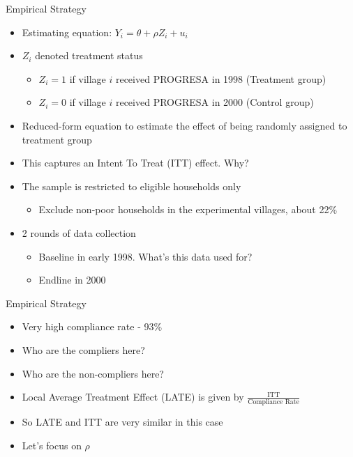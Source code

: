 \documentclass[11pt,notes=hide,aspectratio=169,mathserif]{beamer}
\begin{document}
\begin{frame}{Empirical Strategy}
\begin{itemize}
\item Estimating equation: $Y_i =  \theta + \rho Z_i + u_i $
\pause \item $Z_i$ denoted treatment status 
\begin{itemize}
    \pause \item $Z_i = 1$ if village $i$ received PROGRESA in 1998 (Treatment group)
    \pause \item $Z_i = 0$ if village $i$ received PROGRESA in 2000 (Control group)
\end{itemize}
\pause \item Reduced-form equation to estimate the effect of being randomly assigned to treatment group 
\pause \item This captures an Intent To Treat (ITT) effect. Why? 
\pause \item The sample is restricted to eligible households only
\begin{itemize}
    \pause \item Exclude non-poor households in the experimental villages, about 22\%
\end{itemize}
\pause \item 2 rounds of data collection
\begin{itemize}
    \pause \item Baseline in early 1998. What's this data used for? 
    \pause \item Endline in 2000
\end{itemize}
\end{itemize}
\end{frame}

\begin{frame}{Empirical Strategy}
\begin{itemize}
    \item Very high compliance rate - 93\%
    \pause \item Who are the compliers here?
    \pause \item Who are the non-compliers here?
    \pause \item Local Average Treatment Effect (LATE) is given by $\frac{\text{ITT}}{\text{Compliance Rate}}$
    \pause \item So LATE and ITT are very similar in this case
    \pause \item Let's focus on $\rho$
\end{itemize}
\end{frame}
\end{document}
